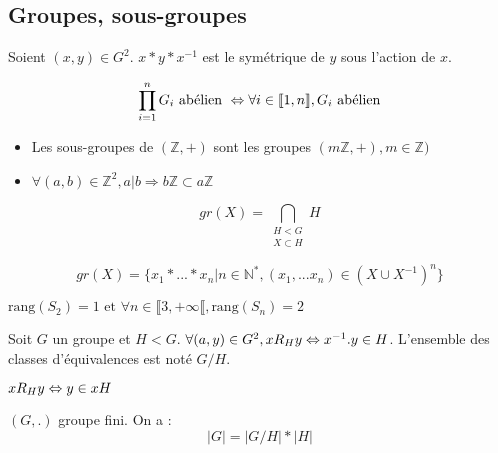 
\subsection{Groupes, sous-groupes}
\begin{defi}
    Soient $(x,y)\in G^2$. $x*y*x^{-1}$ est le symétrique de $y$ sous l'action de $x$.
\end{defi}

\begin{prop}
    \[\prod_{i=1}^n G_i \text{ abélien } \Leftrightarrow\forall i \in \llbracket 1, n \rrbracket, G_i \text{ abélien}\]
\end{prop}

\begin{prop}\begin{itemize}
    \item Les sous-groupes de $(\mathbb{Z}, +)$ sont les groupes $(m\mathbb{Z}, +), m\in\mathbb{Z})$
    \item $\forall (a,b) \in \mathbb{Z}^2, a|b \Rightarrow b\mathbb{Z} \subset a\mathbb{Z}$
\end{itemize}\end{prop}

\begin{defi}
    \[gr(X) = \bigcap_{\substack{H<G\\X\subset H}} H\]
\end{defi}

\begin{lemme}\[
    gr(X) = \{x_1* ... * x_n | n\in\mathbb{N}^*, (x_1, ...x_n) \in (X \cup X^{-1})^n \}
\]\end{lemme}

\begin{lemme} $\text{rang}(S_2) = 1 \text{ et } \forall n \in \llbracket 3, +\infty\llbracket, \text{rang}(S_n) = 2$
\end{lemme}

\begin{defi} Soit $G$ un groupe et $H < G$. $\forall (a,y) \in G^2, xR_Hy \Leftrightarrow x^{-1}.y \in H$. L'ensemble des classes d'équivalences est noté $G/H$.
\end{defi} 

\begin{prop} $xR_Hy \Leftrightarrow y \in xH$
\end{prop}

\begin{theo} $(G,.)$ groupe fini. On a :\[ |G| = |G/H| * |H| \]
\end{theo}

